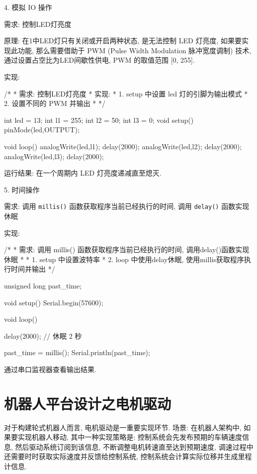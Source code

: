 \documentclass[openany, fontset=windowsold]{ctexbook}
\theoremstyle{kaiti}
\theoremstyle{normal}
\begin{document}
4. 模拟 IO 操作

需求: 控制LED灯亮度

原理: 在1中LED灯只有关闭或开启两种状态, 是无法控制 LED 灯亮度, 如果要实现此功能, 那么需要借助于 PWM (Pulse Width Modulation 脉冲宽度调制) 技术, 通过设置占空比为LED间歇性供电, PWM 的取值范围 [0, 255].

实现:

\begin{cpp}
  /*
   * 需求: 控制LED灯亮度
   * 实现:
   *  1. setup 中设置 led 灯的引脚为输出模式
   *  2. 设置不同的 PWM 并输出
   * 
   */

  int led = 13;
  int l1 = 255;
  int l2 = 50;
  int l3 = 0;
  void setup() {
    pinMode(led,OUTPUT);
  }

  void loop() {
    analogWrite(led,l1);
    delay(2000);
    analogWrite(led,l2);
    delay(2000);
    analogWrite(led,l3);
    delay(2000);
  }
\end{cpp}

运行结果: 在一个周期内 LED 灯亮度递减直至熄灭.

5. 时间操作

需求: 调用 \verb|millis()| 函数获取程序当前已经执行的时间, 调用 \verb|delay()| 函数实现休眠

实现:

\begin{cpp}
  /*
   * 需求: 调用 millis() 函数获取程序当前已经执行的时间, 调用delay()函数实现休眠
   * 
   * 1. setup 中设置波特率
   * 2. loop 中使用delay休眠, 使用millis获取程序执行时间并输出
   */

  unsigned long past_time;

  void setup() {
    Serial.begin(57600);
  }

  void loop() {
    delay(2000); // 休眠 2 秒

    past_time  = millis();
    Serial.println(past_time);  
  }
\end{cpp}

通过串口监视器查看输出结果.

\section{机器人平台设计之电机驱动}

对于构建轮式机器人而言, 电机驱动是一重要实现环节. 场景: 在机器人架构中, 如果要实现机器人移动, 其中一种实现策略是: 控制系统会先发布预期的车辆速度信息, 然后驱动系统订阅到该信息, 不断调整电机转速直至达到预期速度, 调速过程中还需要时时获取实际速度并反馈给控制系统, 控制系统会计算实际位移并生成里程计信息.
\end{document}
